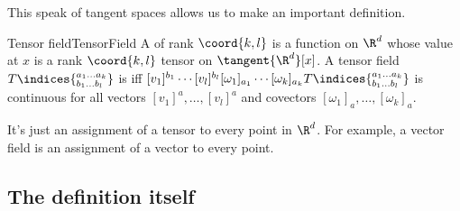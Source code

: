 This speak of tangent spaces allows us to make an important definition.
\begin{dfn}{Tensor field}{TensorField}
A  of rank $\coord{k,l}$ is a function on $\R ^d$ whose value at $x$ is a rank $\coord{k,l}$ tensor on $\tangent{\R ^d}[x]$.  A tensor field $T\indices{^{a_1\ldots a_k}_{b_1\ldots b_l}}$ is  iff $[v_1]^{b_1}\cdots [v_l]^{b_l}[\omega _1]_{a_1}\cdots [\omega _k]_{a_k}T\indices{^{a_1\ldots a_k}_{b_1\ldots b_l}}$ is continuous for all vectors $[v_1]^a,\ldots ,[v_l]^a$ and covectors $[\omega _1]_a,\ldots ,[\omega _k]_a$.
\begin{rmk}
It's just an assignment of a tensor to every point in $\R ^d$.  For example, a vector field is an assignment of a vector to every point.
\end{rmk}
\end{dfn}

\subsection{The definition itself}

